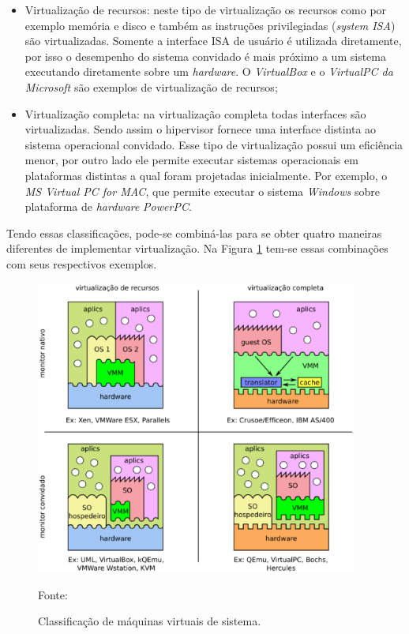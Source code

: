 \begin{itemize}
 \item Virtualização de recursos: neste tipo de virtualização os recursos como por exemplo memória e disco e também as instruções 
 privilegiadas (\textit{system \ac{ISA}}) são virtualizadas. Somente a interface \ac{ISA} de usuário é utilizada diretamente, 
 por isso o desempenho do sistema convidado é mais próximo a um sistema executando diretamente sobre um \textit{hardware}. O 
 \textit{VirtualBox} e o \textit{VirtualPC da Microsoft} são exemplos de virtualização de recursos;
 \item Virtualização completa: na virtualização completa todas interfaces são virtualizadas. Sendo assim o hipervisor fornece uma
 interface distinta ao sistema operacional convidado. Esse tipo de virtualização possui um eficiência menor, por outro lado ele
 permite executar sistemas operacionais em plataformas distintas a qual foram projetadas inicialmente. Por exemplo, o 
 \textit{MS Virtual PC for MAC}, que permite executar o sistema \textit{Windows} sobre plataforma de \textit{hardware} \textit{PowerPC}.
\end{itemize}

Tendo essas classificações, pode-se combiná-las para se obter quatro maneiras diferentes de implementar virtualização. Na Figura 
\ref{fig:vms_classificacao} tem-se essas combinações com seus respectivos exemplos.

\begin{figure}[vms_classificacao]
 \centering
 \includegraphics[width=400px]{img/vms_classificacao.eps}
 \caption{Classificação de máquinas virtuais de sistema.}
 \label{fig:vms_classificacao}
 Fonte: \citet{laureano2008}
\end{figure}

